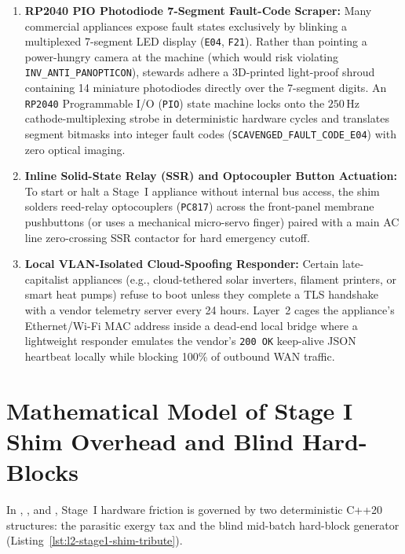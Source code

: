 \begin{enumerate}
    \item \textbf{RP2040 PIO Photodiode 7-Segment Fault-Code Scraper:} Many commercial appliances expose fault states exclusively by blinking a multiplexed 7-segment LED display (\texttt{E04}, \texttt{F21}). Rather than pointing a power-hungry camera at the machine (which would risk violating \texttt{INV\_ANTI\_PANOPTICON}), stewards adhere a 3D-printed light-proof shroud containing 14 miniature photodiodes directly over the 7-segment digits. An \texttt{RP2040} Programmable I/O (\texttt{PIO}) state machine locks onto the $250\,\mathrm{Hz}$ cathode-multiplexing strobe in deterministic hardware cycles and translates segment bitmasks into integer fault codes (\texttt{SCAVENGED\_FAULT\_CODE\_E04}) with zero optical imaging.
    \item \textbf{Inline Solid-State Relay (SSR) and Optocoupler Button Actuation:} To start or halt a Stage~I appliance without internal bus access, the shim solders reed-relay optocouplers (\texttt{PC817}) across the front-panel membrane pushbuttons (or uses a mechanical micro-servo finger) paired with a main AC line zero-crossing SSR contactor for hard emergency cutoff.
    \item \textbf{Local VLAN-Isolated Cloud-Spoofing Responder:} Certain late-capitalist appliances (e.g., cloud-tethered solar inverters, filament printers, or smart heat pumps) refuse to boot unless they complete a TLS handshake with a vendor telemetry server every 24 hours. Layer~2 cages the appliance's Ethernet/Wi-Fi MAC address inside a dead-end local bridge where a lightweight responder emulates the vendor's \texttt{200 OK} keep-alive JSON heartbeat locally while blocking 100\% of outbound WAN traffic.
\end{enumerate}

\section{Mathematical Model of Stage I Shim Overhead and Blind Hard-Blocks}
\label{sec:l2-stage1-math-model}

In , , and , Stage~I hardware friction is governed by two deterministic C++20 structures: the parasitic exergy tax and the blind mid-batch hard-block generator (Listing~\ref{lst:l2-stage1-shim-tribute}).

